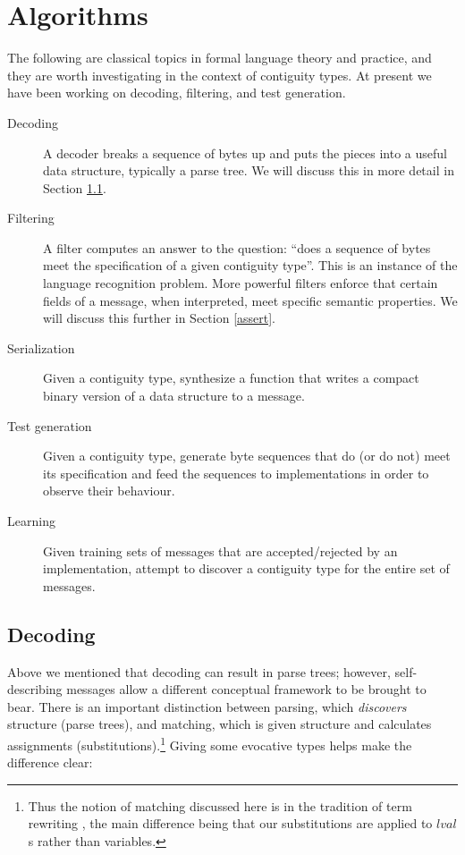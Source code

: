 \documentclass[a4paper,UKenglish,cleveref, autoref, thm-restate]{lipics-v2021}
\begin{document}
\section{Algorithms}

The following are classical topics in formal language theory and
practice, and they are worth investigating in the context of
contiguity types. At present we have been working on decoding,
filtering, and test generation.

\begin{description}

\item [Decoding] A decoder breaks a sequence of bytes up and puts the
  pieces into a useful data structure, typically a parse tree. We will
  discuss this in more detail in Section \ref{decoding}.

\item [Filtering] A filter computes an answer to the question: ``does
  a sequence of bytes meet the specification of a given contiguity
  type''. This is an instance of the language recognition
  problem. More powerful filters enforce that certain fields of a
  message, when interpreted, meet specific semantic properties. We
  will discuss this further in Section \ref{assert}.

\item [Serialization] Given a contiguity type, synthesize a function
  that writes a compact binary version of a data structure to a message.

\item [Test generation] Given a contiguity type, generate byte
  sequences that do (or do not) meet its specification and feed the
  sequences to implementations in order to observe their behaviour.

\item [Learning] Given training sets of messages that are
  accepted/rejected by an implementation, attempt to discover a
  contiguity type for the entire set of messages.

\end{description}

\subsection{Decoding}
\label{decoding}

Above we mentioned that decoding can result in parse trees; however,
self-describing messages allow a different conceptual framework to be
brought to bear. There is an important distinction between parsing,
which \emph{discovers} structure (parse trees), and matching, which is
given structure and calculates assignments
(substitutions).\footnote{Thus the notion of matching discussed here
  is in the tradition of term rewriting \cite{baader:nipkow}, the main
  difference being that our substitutions are applied to
  $\mathit{lval}$s rather than variables.} Giving some evocative types
helps make the difference clear:
\end{document}
